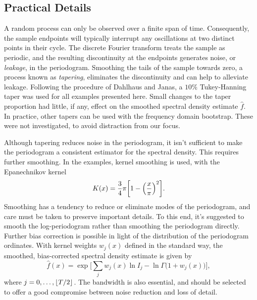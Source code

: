\subsection*{Practical Details}
A random process can only be observed over a finite span of time.
Consequently, the sample endpoints will typically interrupt any oscillations
at two distinct points in their cycle.
The discrete Fourier transform treats the sample as periodic,
and the resulting discontinuity at the endpoints generates noise,
or \textit{leakage}, in the periodogram.
Smoothing the tails of the sample towards zero,
a process known as \textit{tapering},
eliminates the discontinuity and can help to alleviate leakage.
Following the procedure of Dahlhaus and Janas,
a $10\%$ Tukey-Hanning taper was used for all examples presented here.
Small changes to the taper proportion had little, if any,
effect on the smoothed spectral density estimate $\hat{f}$.
In practice, other tapers can be used with the frequency domain bootstrap.
These were not investigated, to avoid distraction from our focus.

Although tapering reduces noise in the periodogram,
it isn't sufficient to make the periodogram a consistent estimator for the
spectral density.
This requires further smoothing.
In the examples, kernel smoothing is used, with the Epanechnikov kernel
    \[
    K(x) 
    = 
    \frac{3}{4}\pi \biggl[ 1 - \Bigl( \frac{x}{\pi} \Bigr)^2 \biggr].
    \]
Smoothing has a tendency to reduce or eliminate modes of the periodogram,
and care must be taken to preserve important details.
To this end, it's suggested to smooth the log-periodogram rather than smoothing
the periodogram directly.
Further bias correction is possible in light of the distribution of the
periodogram ordinates.
With kernel weights $w_j(x)$ defined in the standard way,
the smoothed, bias-corrected spectral density estimate is given by
    \[
    \hat{f}(x)
    =
    \exp\biggl[
        \sum_{j} w_j(x) \ln I_{j} 
        - \ln \Gamma\bigl(1 + w_j(x)\bigr)
    \biggr],
    \]
where $j = 0, \ldots, \lfloor T / 2\rfloor$.
The bandwidth is also essential, 
and should be selected to offer a good compromise between noise reduction and
loss of detail.

